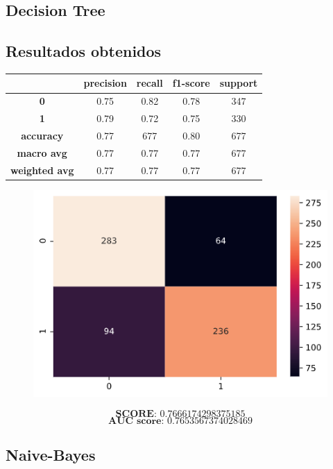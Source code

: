 \documentclass[11pt,a4paper]{article}
\begin{document}
\subsection{Decision Tree}

\subsection*{Resultados obtenidos}
\begin{table}[H]
    \centering
    \begin{tabular}{c|cccc}
        \textbf{} & \textbf{precision} & \textbf{recall} & \textbf{f1-score} & \textbf{support} \\ \hline
        \textbf{0} & 0.75 & 0.82 & 0.78 & 347 \\
        \textbf{1} & 0.79 & 0.72 & 0.75 & 330 \\ \hline
        \textbf{accuracy} & 0.77 & 677 & 0.80 & 677 \\
        \textbf{macro avg} & 0.77 & 0.77 & 0.77 & 677 \\
        \textbf{weighted avg} & 0.77 & 0.77 & 0.77 & 677
    \end{tabular}
\end{table}

\begin{figure}[H]
    \centering
    \includegraphics[scale=0.5]{img/matrix-tree.png}    
\end{figure}
$$\textbf{SCORE:  } 0.7666174298375185$$
$$\textbf{AUC score:  } 0.7653567374028469$$


\subsection{Naive-Bayes}
\end{document}
